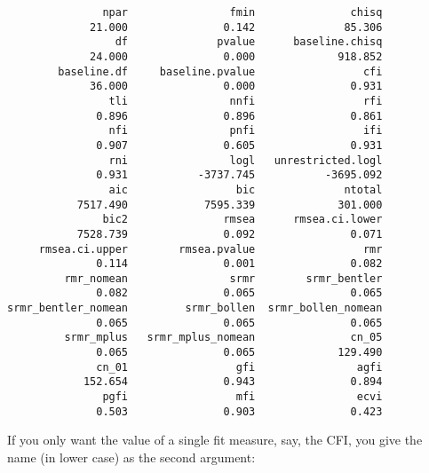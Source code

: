 \begin{Shaded}
\begin{Highlighting}[]
\StringTok{ }
\end{Highlighting}
\end{Shaded}

\begin{verbatim}
               npar                fmin               chisq 
             21.000               0.142              85.306 
                 df              pvalue      baseline.chisq 
             24.000               0.000             918.852 
        baseline.df     baseline.pvalue                 cfi 
             36.000               0.000               0.931 
                tli                nnfi                 rfi 
              0.896               0.896               0.861 
                nfi                pnfi                 ifi 
              0.907               0.605               0.931 
                rni                logl   unrestricted.logl 
              0.931           -3737.745           -3695.092 
                aic                 bic              ntotal 
           7517.490            7595.339             301.000 
               bic2               rmsea      rmsea.ci.lower 
           7528.739               0.092               0.071 
     rmsea.ci.upper        rmsea.pvalue                 rmr 
              0.114               0.001               0.082 
         rmr_nomean                srmr        srmr_bentler 
              0.082               0.065               0.065 
srmr_bentler_nomean         srmr_bollen  srmr_bollen_nomean 
              0.065               0.065               0.065 
         srmr_mplus   srmr_mplus_nomean               cn_05 
              0.065               0.065             129.490 
              cn_01                 gfi                agfi 
            152.654               0.943               0.894 
               pgfi                 mfi                ecvi 
              0.503               0.903               0.423 
\end{verbatim}

If you only want the value of a single fit measure, say, the CFI, you
give the name (in lower case) as the second argument:

\begin{Shaded}
\begin{Highlighting}[]
\StringTok{ }
\NormalTok{)}
\end{Highlighting}
\end{Shaded}

